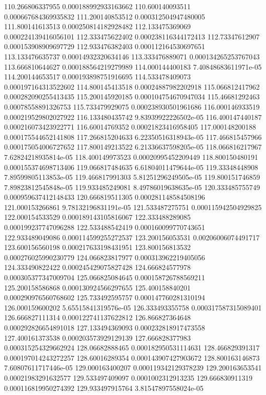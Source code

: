 {110.266806337955 0.000188992933163662
110.600140093511 0.000667684369935832
111.200140853512 0.000312504947480005
111.800141613513 0.000250814182928482
112.133475369069 0.000224139416056101
112.333475622402 0.000238116344172413
112.73347612907 0.000153908909697729
112.933476382403 0.000112164530697651
113.133476635737 0.00014932320634146
113.333476889071 0.000134265253767043
113.666810644627 0.000188564219279989
114.000144400183 7.40848683611971e-05
114.200144653517 0.000193898751916695
114.533478409073 0.000197164313522602
114.800145413518 0.00024887982202918
115.066812417962 0.000282090255413435
115.200145920185 0.000104754670947034
115.46681292463 0.00078558891326753
115.733479929075 0.000238930501961686
116.000146933519 0.000219529802027922
116.133480435742 9.83939922226502e-05
116.400147440187 0.000216073423922771
116.60014769352 0.00021823416958405
117.000148200188 0.000175544652141808
117.266815204633 6.22350516318943e-05
117.466815457966 0.000175054006727652
117.800149213522 6.21336637598205e-05
118.066816217967 7.62824218935814e-05
118.400149973523 0.00020995452209449
118.800150480191 0.000155374698713406
119.066817484635 6.61804011479644e-05
119.33348448908 7.89599805113853e-05
119.466817991303 5.81251296249505e-05
119.800151746859 7.89823812545848e-05
119.933485249081 8.49786019638635e-05
120.333485755749 0.000959637412148433
120.666819511305 0.000281148584508196
121.000153266861 9.78132196831191e-05
121.533487275751 0.000115942504929825
122.000154533529 0.000189143105816067
122.333488289085 0.000199237747096288
122.533488542419 0.000160099770743651
122.933489049086 0.000114599255272537
123.200156053531 0.00206006074491717
123.600156560198 0.000217633198431951
123.800156813532 0.000276025990230779
124.066823817977 0.000313962219405056
124.333490822422 0.000245429075827428
124.666824577978 0.000305377347009704
125.066825084645 0.000158726788569211
125.200158586868 0.000130924566297655
125.400158840201 0.000290976560768602
125.733492595757 0.000147760281310194
126.000159600202 5.65515841319576e-05
126.333493355758 0.000317587315089401
126.666827111314 0.000122741137622812
126.866827364648 0.000292826654891018
127.133494369093 0.000232818917473558
127.400161373538 0.000203573929129139
127.666828377983 0.000315254329662924
128.06682888465 0.000182950531114631
128.466829391317 0.000197014243272257
128.60016289354 0.000143907427903672
128.800163146873 7.60807611717446e-05
129.000163400207 0.000119342129378239
129.200163653541 0.00021983291632577
129.533497409097 0.0001002312913235
129.666830911319 0.000116819950274392
129.933497915764 3.81547897558024e-05
}
